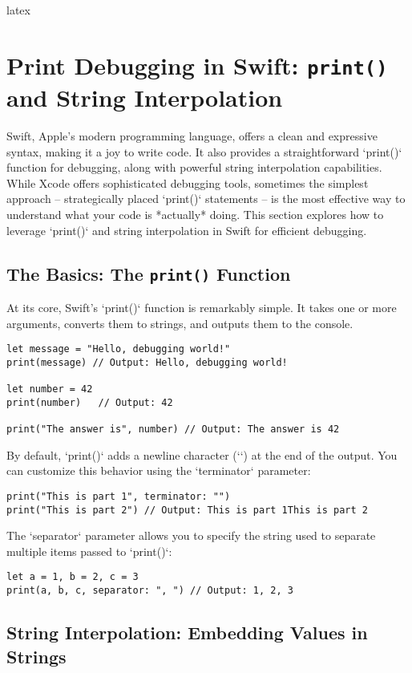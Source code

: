 \documentclass{article}
\begin{document}
{{{{latex
\section*{Print Debugging in Swift: \texttt{print()} and String Interpolation}

Swift, Apple's modern programming language, offers a clean and expressive syntax, making it a joy to write code.  It also provides a straightforward `print()` function for debugging, along with powerful string interpolation capabilities. While Xcode offers sophisticated debugging tools, sometimes the simplest approach – strategically placed `print()` statements – is the most effective way to understand what your code is *actually* doing. This section explores how to leverage `print()` and string interpolation in Swift for efficient debugging.

\subsection*{The Basics: The \texttt{print()} Function}

At its core, Swift's `print()` function is remarkably simple. It takes one or more arguments, converts them to strings, and outputs them to the console.

\begin{verbatim}
let message = "Hello, debugging world!"
print(message) // Output: Hello, debugging world!

let number = 42
print(number)   // Output: 42

print("The answer is", number) // Output: The answer is 42
\end{verbatim}

By default, `print()` adds a newline character (`\n`) at the end of the output.  You can customize this behavior using the `terminator` parameter:

\begin{verbatim}
print("This is part 1", terminator: "")
print("This is part 2") // Output: This is part 1This is part 2
\end{verbatim}

The `separator` parameter allows you to specify the string used to separate multiple items passed to `print()`:

\begin{verbatim}
let a = 1, b = 2, c = 3
print(a, b, c, separator: ", ") // Output: 1, 2, 3
\end{verbatim}

\subsection*{String Interpolation: Embedding Values in Strings}

}}}}
\end{document}
